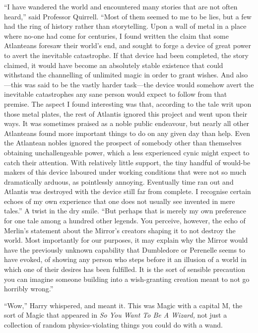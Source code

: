 “I have wandered the world and encountered many stories that are not often heard,” said Professor Quirrell. “Most of them seemed to me to be lies, but a few had the ring of history rather than storytelling. Upon a wall of metal in a place where no-one had come for centuries, I found written the claim that some Atlanteans foresaw their world’s end, and sought to forge a device of great power to avert the inevitable catastrophe. If that device had been completed, the story claimed, it would have become an absolutely stable existence that could withstand the channelling of unlimited magic in order to grant wishes. And also—this was said to be the vastly harder task—the device would somehow avert the inevitable catastrophes any sane person would expect to follow from that premise. The aspect I found interesting was that, according to the tale writ upon those metal plates, the rest of Atlantis ignored this project and went upon their ways. It was sometimes praised as a noble public endeavour, but nearly all other Atlanteans found more important things to do on any given day than help. Even the Atlantean nobles ignored the prospect of somebody other than themselves obtaining unchallengeable power, which a less experienced cynic might expect to catch their attention. With relatively little support, the tiny handful of would-be makers of this device laboured under working conditions that were not so much dramatically arduous, as pointlessly annoying. Eventually time ran out and Atlantis was destroyed with the device still far from complete. I recognise certain echoes of my own experience that one does not usually see invented in mere tales.” A twist in the dry smile. “But perhaps that is merely my own preference for one tale among a hundred other legends. You perceive, however, the echo of Merlin’s statement about the Mirror’s creators shaping it to not destroy the world. Most importantly for our purposes, it may explain why the Mirror would have the previously unknown capability that Dumbledore or Perenelle seems to have evoked, of showing any person who steps before it an illusion of a world in which one of their desires has been fulfilled. It is the sort of sensible precaution you can imagine someone building into a wish-granting creation meant to not go horribly wrong.”

“Wow,” Harry whispered, and meant it. This was Magic with a capital M, the sort of Magic that appeared in \emph{So You Want To Be A Wizard,} not just a collection of random physics-violating things you could do with a wand.

